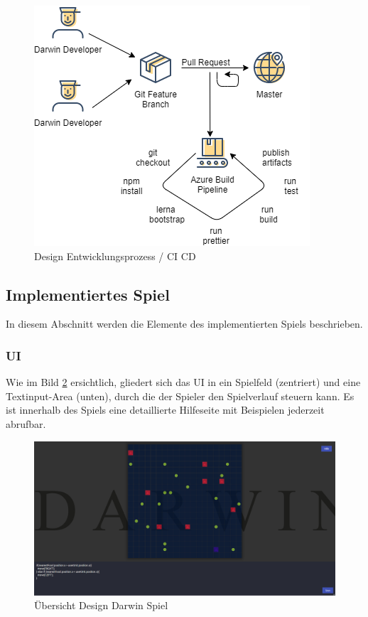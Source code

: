 \documentclass[11pt,a4paper,titlepage]{article}
\begin{document}
\begin{figure}[H]
	\centering
	\includegraphics{workflow.png}
	\caption{Design Entwicklungsprozess / CI CD}
	\label{pipeline}
\end{figure}

\subsection{Implementiertes Spiel}

In diesem Abschnitt werden die Elemente des implementierten Spiels beschrieben.

\subsubsection{UI}

Wie im Bild \ref{gameplay} ersichtlich, gliedert sich das UI in ein Spielfeld (zentriert) und eine Textinput-Area (unten), durch die der Spieler den Spielverlauf steuern kann. Es ist innerhalb des Spiels eine detaillierte Hilfeseite mit Beispielen jederzeit abrufbar.

\begin{figure}[H]
	\centering
	\includegraphics[width=\textwidth]{darwin-gameplay.png}
	\caption{Übersicht Design Darwin Spiel}
	\label{gameplay}
\end{figure}
\end{document}
